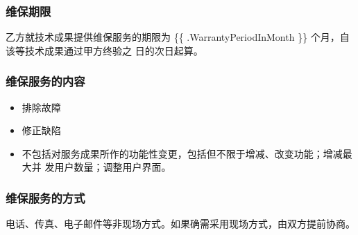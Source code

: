 \subsubsection{维保期限}
乙方就技术成果提供维保服务的期限为 \{\{ .WarrantyPeriodInMonth \}\} 个月，自该等技术成果通过甲方终验之
日的次日起算。

\subsubsection{维保服务的内容}
\begin{itemize}
  \item 排除故障
  \item 修正缺陷
  \item 不包括对服务成果所作的功能性变更，包括但不限于增减、改变功能；增减最大并
发用户数量；调整用户界面。
\end{itemize}

\subsubsection{维保服务的方式}
电话、传真、电子邮件等非现场方式。如果确需采用现场方式，由双方提前协商。
